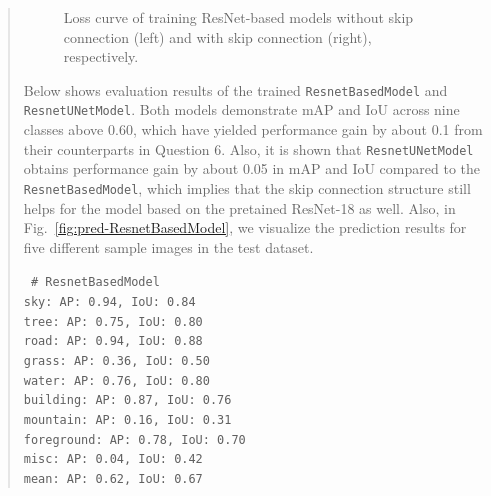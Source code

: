 \documentclass[11pt]{article}
\begin{document}
\begin{quote}
\begin{figure}[h]
    \centering
    \qquad
    \caption{Loss curve of training ResNet-based models without skip connection (left) and with skip connection (right), respectively.}
    \label{fig:loss-ResnetBasedModel}
\end{figure}

Below shows evaluation results of the trained \texttt{ResnetBasedModel} and \texttt{ResnetUNetModel}. Both models demonstrate mAP and IoU across nine classes above 0.60, which have yielded performance gain by about 0.1 from their counterparts in Question 6. Also, it is shown that \texttt{ResnetUNetModel} obtains performance gain by about 0.05 in mAP and IoU compared to the \texttt{ResnetBasedModel}, which implies that the skip connection structure still helps for the model based on the pretained ResNet-18 as well. Also, in Fig.~\ref{fig:pred-ResnetBasedModel}, we visualize the prediction results for five different sample images in the test dataset.

{\centering \tt \small
\# ResnetBasedModel \\
sky: AP: 0.94, IoU: 0.84 \\
tree: AP: 0.75, IoU: 0.80 \\
road: AP: 0.94, IoU: 0.88 \\
grass: AP: 0.36, IoU: 0.50 \\
water: AP: 0.76, IoU: 0.80 \\
building: AP: 0.87, IoU: 0.76 \\
mountain: AP: 0.16, IoU: 0.31 \\
foreground: AP: 0.78, IoU: 0.70 \\
misc: AP: 0.04, IoU: 0.42 \\
mean: AP: 0.62, IoU: 0.67 \\

}
\end{quote}
\end{document}
